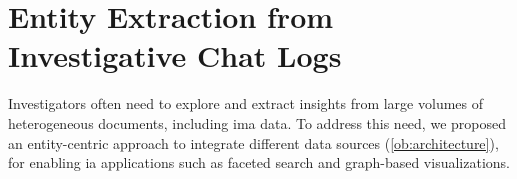 \section[Entity Extraction from Investigative Chat Logs][EE from Investigative Chat Logs]{Entity Extraction from Investigative Chat Logs}
\label{sec:eechats}







Investigators often need to explore and extract insights from large volumes of heterogeneous documents, including \acf{ima} data. To address this need, we proposed an entity-centric approach to integrate different data sources (\ref{ob:architecture}), for enabling \acl{ia} applications such as faceted search and graph-based visualizations.

